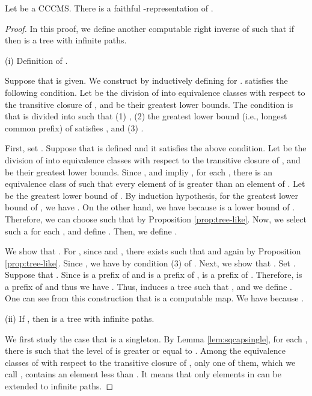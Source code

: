 \documentclass{eptcs-modified}
\begin{document}
\begin{theorem}\label{theo:minimalfaithful}
  Let  be a CCCMS. There is a faithful -representation of .
\begin{proof}
  In this proof, we  define another computable right inverse  of  such that if  then  is a tree with  infinite paths.





(i) Definition of .

Suppose that  is given.  We construct  by
inductively defining  for .
 satisfies the following condition.
 Let  be the
division of  into equivalence classes with respect to the transitive closure of ,
and  be their greatest lower bounds.  The condition is that
 is divided into    such that (1) ,
(2)  the greatest lower bound (i.e., longest common prefix)  of  satisfies
,   and (3) .



First, set .  Suppose that  is defined and it satisfies the above condition.  Let  be the division of
 into equivalence classes with respect to the transitive closure of , and
   be their greatest lower bounds.  Since ,  and
   impliy , for each , there is an equivalence class  of 
  such that every element of  is greater than an element of .
Let  be the greatest lower
  bound of . By induction hypothesis, for the greatest lower bound  of , we have .  On the other hand, we have  because  is a lower bound
  of .  Therefore, we can choose 
such that  by Proposition \ref{prop:tree-like}.
Now, we select such a  for each , and
define .  Then, we define
.

We show that  .  For , since  and ,
there exists  such that  and  again by Proposition \ref{prop:tree-like}.
Since , we have  by condition (3) of .  Next, we show that
.    Set .
Suppose that .
Since  is a prefix of  and  is a prefix of ,  is a prefix of .
Therefore,  is a prefix of  and thus we have .
Thus,  induces a
  tree  such that , and we define .
One can see from this construction that
   is a computable map.
We have   because .

(ii) If , then  is a tree with  infinite paths.

We first study the case that  is a singleton.
By Lemma \ref{lem:sqcapsingle}, for each , there is  such that the level of  is greater or equal to .
Among the equivalence classes of 
with respect to the transitive closure of , only one of them, which we call , contains an element less than .  It means that
only elements in  can be extended to infinite paths.


\end{proof}
\end{theorem}
\end{document}
